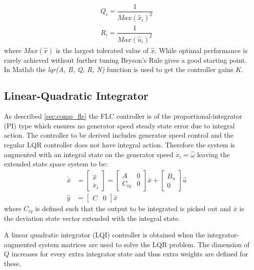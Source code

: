 \begin{equation}\label{eq:bryson}
	\begin{split}
		Q_i = \dfrac{1}{Max(\hat x_i)^2} \\
		R_i = \dfrac{1}{Max(\hat u_i)^2}
	\end{split}
\end{equation}
where $ Max(\hat x) $ is the largest tolerated value of $ \hat x $. While optimal performance is rarely achieved without further tuning Bryson's Rule gives a good starting point. In Matlab the \textit{lqr(A, B, Q, R, N)} function is used to get the controller gains $ K $.


\subsection{Linear-Quadratic Integrator} \label{sec:ctrl_lqi}
As described \cref{sec:comp_flc} the FLC controller is of the proportional-integrator (PI) type which ensures no generator speed steady state error due to integral action. The controller to be derived includes generator speed control and the regular LQR controller does not have integral action. Therefore the system is augmented with an integral state on the generator speed $ \dot x_i = \hat \omega $ leaving the extended state space system to be:
\begin{align} 
	\dot {\bar x} & = \begin{bmatrix} \dot{\hat x} \\ \dot x_i \end{bmatrix} = \begin{bmatrix} A &0 \\ C_{iy} & 0 \end{bmatrix} \bar x + \begin{bmatrix} B_u \\ 0 \end{bmatrix}  \hat u \\
	\hat y & = \begin{bmatrix} C & 0 \end{bmatrix} \bar x
\end{align}
where $ C_{iy} $ is defined such that the output to be integrated is picked out and $ \bar x $ is the deviation state vector extended with the integral state. %

A linear quadratic integrator (LQI) controller is obtained when the integrator-augmented system matrices are used to solve the LQR problem. The dimension of $ Q $ increases for every extra integrator state and thus extra weights are defined for these. 



